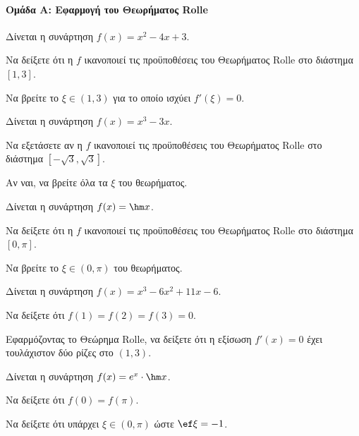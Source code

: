 \documentclass[11pt,a4paper,modern]{FFExercises}
\begin{document}


\paragraph{Ομάδα Α: Εφαρμογή του Θεωρήματος Rolle}

\askhsh
Δίνεται η συνάρτηση $f(x) = x^2 - 4x + 3$.
\begin{alist}
  \item Να δείξετε ότι η $f$ ικανοποιεί τις προϋποθέσεις του Θεωρήματος Rolle στο διάστημα $[1, 3]$.
  \item Να βρείτε το $\xi \in (1, 3)$ για το οποίο ισχύει $f'(\xi) = 0$.
\end{alist}

\askhsh
Δίνεται η συνάρτηση $f(x) = x^3 - 3x$.
\begin{alist}
  \item Να εξετάσετε αν η $f$ ικανοποιεί τις προϋποθέσεις του Θεωρήματος Rolle στο διάστημα $[-\sqrt{3}, \sqrt{3}]$.
  \item Αν ναι, να βρείτε όλα τα $\xi$ του θεωρήματος.
\end{alist}

\askhsh
Δίνεται η συνάρτηση $f(x) = \hm x$.
\begin{alist}
  \item Να δείξετε ότι η $f$ ικανοποιεί τις προϋποθέσεις του Θεωρήματος Rolle στο διάστημα $[0, \pi]$.
  \item Να βρείτε το $\xi \in (0, \pi)$ του θεωρήματος.
\end{alist}

\askhsh
Δίνεται η συνάρτηση $f(x) = x^3 - 6x^2 + 11x - 6$.
\begin{alist}
  \item Να δείξετε ότι $f(1) = f(2) = f(3) = 0$.
  \item Εφαρμόζοντας το Θεώρημα Rolle, να δείξετε ότι η εξίσωση $f'(x) = 0$ έχει τουλάχιστον δύο ρίζες στο $(1, 3)$.
\end{alist}

\askhsh
Δίνεται η συνάρτηση $f(x) = e^x \cdot \hm x$.
\begin{alist}
  \item Να δείξετε ότι $f(0) = f(\pi)$.
  \item Να δείξετε ότι υπάρχει $\xi \in (0, \pi)$ ώστε $\ef\xi = -1$.
\end{alist}
\end{document}
